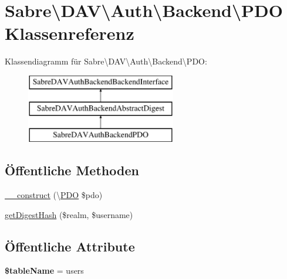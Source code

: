 \hypertarget{class_sabre_1_1_d_a_v_1_1_auth_1_1_backend_1_1_p_d_o}{}\section{Sabre\textbackslash{}D\+AV\textbackslash{}Auth\textbackslash{}Backend\textbackslash{}P\+DO Klassenreferenz}
\label{class_sabre_1_1_d_a_v_1_1_auth_1_1_backend_1_1_p_d_o}
Klassendiagramm für Sabre\textbackslash{}D\+AV\textbackslash{}Auth\textbackslash{}Backend\textbackslash{}P\+DO\+:\begin{figure}[H]
\begin{center}
\leavevmode
\includegraphics[height=3.000000cm]{class_sabre_1_1_d_a_v_1_1_auth_1_1_backend_1_1_p_d_o}
\end{center}
\end{figure}
\subsection*{Öffentliche Methoden}
\begin{DoxyCompactItemize}
\item 
\mbox{\hyperlink{class_sabre_1_1_d_a_v_1_1_auth_1_1_backend_1_1_p_d_o_a15e35f8396884fad19af06d9b85f9db8}{\+\_\+\+\_\+construct}} (\textbackslash{}\mbox{\hyperlink{class_sabre_1_1_d_a_v_1_1_auth_1_1_backend_1_1_p_d_o}{P\+DO}} \$pdo)
\item 
\mbox{\hyperlink{class_sabre_1_1_d_a_v_1_1_auth_1_1_backend_1_1_p_d_o_a17bf29a6cd60e95adcc7a59de4eea575}{get\+Digest\+Hash}} (\$realm, \$username)
\end{DoxyCompactItemize}
\subsection*{Öffentliche Attribute}
\begin{DoxyCompactItemize}
\item 
\mbox{\label{class_sabre_1_1_d_a_v_1_1_auth_1_1_backend_1_1_p_d_o_ab82d1b2be8da7125a42d3a9333b119cf}} 
{\bfseries \$table\+Name} = \textquotesingle{}users\textquotesingle{}
\end{DoxyCompactItemize}
